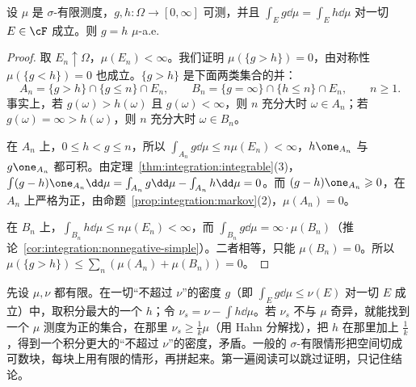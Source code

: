\begin{lemma}[密度的唯一性]\label{lem:ac:density-unique}
设 $\mu$ 是 $\sigma$-有限测度，$g,h:\Omega\to[0,\infty]$ 可测，并且 $\int_Eg\dd\mu=\int_Eh\dd\mu$ 对一切 $E\in\cF$ 成立。则 $g=h$ $\mu$-a.e.
\end{lemma}
\begin{proof}
取 $E_n\uparrow\Omega$，$\mu(E_n)<\infty$。我们证明 $\mu(\{g>h\})=0$，由对称性 $\mu(\{g<h\})=0$ 也成立。$\{g>h\}$ 是下面两类集合的并：
\[
A_n=\{g>h\}\cap\{g\leqslant n\}\cap E_n,\qquad B_n=\{g=\infty\}\cap\{h\leqslant n\}\cap E_n,\qquad n\geqslant1 .
\]
事实上，若 $g(\omega)>h(\omega)$ 且 $g(\omega)<\infty$，则 $n$ 充分大时 $\omega\in A_n$；若 $g(\omega)=\infty>h(\omega)$，则 $n$ 充分大时 $\omega\in B_n$。

在 $A_n$ 上，$0\leqslant h<g\leqslant n$，所以 $\int_{A_n}g\dd\mu\leqslant n\mu(E_n)<\infty$，$h\one_{A_n}$ 与 $g\one_{A_n}$ 都可积。由定理~\ref{thm:integration:integrable}(3)，$\int(g-h)\one_{A_n}\dd\mu=\int_{A_n}g\dd\mu-\int_{A_n}h\dd\mu=0$。而 $(g-h)\one_{A_n}\geqslant0$，在 $A_n$ 上严格为正，由命题~\ref{prop:integration:markov}(2)，$\mu(A_n)=0$。

在 $B_n$ 上，$\int_{B_n}h\dd\mu\leqslant n\mu(E_n)<\infty$，而 $\int_{B_n}g\dd\mu=\infty\cdot\mu(B_n)$（推论~\ref{cor:integration:nonnegative-simple}）。二者相等，只能 $\mu(B_n)=0$。所以 $\mu(\{g>h\})\leqslant\sum_n(\mu(A_n)+\mu(B_n))=0$。
\end{proof}

\begin{remark}[证明思路]
先设 $\mu,\nu$ 都有限。在一切“不超过 $\nu$”的密度 $g$（即 $\int_Eg\dd\mu\leqslant\nu(E)$ 对一切 $E$ 成立）中，取积分最大的一个 $h$；令 $\nu_s=\nu-\int h\dd\mu$。若 $\nu_s$ 不与 $\mu$ 奇异，就能找到一个 $\mu$ 测度为正的集合，在那里 $\nu_s\geqslant\frac1k\mu$（用 Hahn 分解找），把 $h$ 在那里加上 $\frac1k$，得到一个积分更大的“不超过 $\nu$”的密度，矛盾。一般的 $\sigma$-有限情形把空间切成可数块，每块上用有限的情形，再拼起来。第一遍阅读可以跳过证明，只记住结论。
\end{remark}

